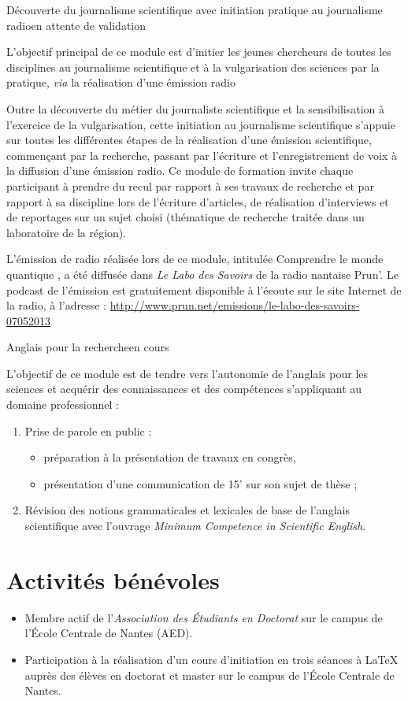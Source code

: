 \formation
{Découverte du journalisme scientifique avec initiation pratique au journalisme radio}{en attente de validation}
{L'objectif principal de ce module est d'initier les jeunes chercheurs de toutes les disciplines au journalisme scientifique et à la vulgarisation des sciences par la pratique, \textit{via} la réalisation d'une émission radio

Outre la découverte du métier du journaliste scientifique et la sensibilisation à l'exercice de la vulgarisation, cette initiation au journalisme scientifique s'appuie sur toutes les différentes étapes de la réalisation d'une émission scientifique, commençant par la recherche, passant par l'écriture et l'enregistrement de voix à la diffusion d'une émission radio. Ce module de formation invite chaque participant à prendre du recul par rapport à ses travaux de recherche et par rapport à sa discipline lors de l'écriture d'articles, de réalisation d'interviews et de reportages sur un sujet choisi (thématique de recherche traitée dans un laboratoire de la région).

L'émission de radio réalisée lors de ce module, intitulée \og Comprendre le monde quantique \fg, a été diffusée dans \textit{Le Labo des Savoirs} de la radio nantaise Prun'.
Le podcast de l'émission est gratuitement disponible à l'écoute sur le site Internet de la radio,
à l'adresse : \url{http://www.prun.net/emissions/le-labo-des-savoirs-07052013}}

\formation
{Anglais pour la recherche}{en cours}
{L'objectif de ce module est de tendre vers l'autonomie de l'anglais pour les sciences et acquérir des connaissances et des compétences s'appliquant au domaine professionnel :
\begin{enumerate}
  \item Prise de parole en public :
  \begin{itemize}
    \item préparation à la présentation de travaux en congrès,
    \item présentation d'une communication de 15' sur son sujet de thèse ;
  \end{itemize}
  \item Révision des notions grammaticales et lexicales de base de l'anglais scientifique avec l'ouvrage \textit{Minimum Competence in Scientific English}.
\end{enumerate}}



\section{Activités bénévoles}
\begin{itemize}
\renewcommand{\labelitemi}{\qquad$\circ$}
  \item Membre actif de l'\emph{Association des Étudiants en Doctorat} sur le campus de l'École Centrale de Nantes (AED).
  \item Participation à la réalisation d'un cours d'initiation en trois séances à \LaTeX{} auprès des élèves en doctorat et master sur le campus de l'École Centrale de Nantes.
\end{itemize}
